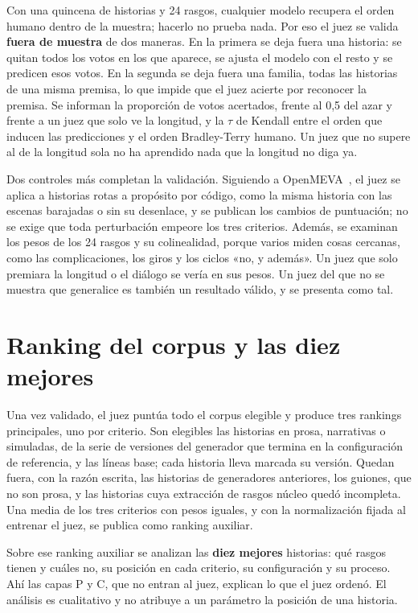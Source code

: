 Con una quincena de historias y 24 rasgos, cualquier modelo recupera el orden humano dentro de la
muestra; hacerlo no prueba nada. Por eso el juez se valida \textbf{fuera de muestra} de dos maneras.
En la primera se deja fuera una historia: se quitan todos los votos en los que aparece, se ajusta el
modelo con el resto y se predicen esos votos. En la segunda se deja fuera una familia, todas las
historias de una misma premisa, lo que impide que el juez acierte por reconocer la premisa. Se
informan la proporción de votos acertados, frente al 0,5 del azar y frente a un juez que solo ve
la longitud, y la $\tau$ de Kendall entre el orden que inducen las predicciones y el orden
Bradley-Terry humano. Un juez que no supere al de la longitud sola no ha aprendido nada que la
longitud no diga ya.

Dos controles más completan la validación. Siguiendo a OpenMEVA~\cite{guan2021}, el juez se aplica a
historias rotas a propósito por código, como la misma historia con las escenas barajadas o sin su
desenlace, y se publican los cambios de puntuación; no se exige que toda perturbación empeore los
tres criterios. Además, se examinan los pesos de los 24 rasgos y su colinealidad, porque varios
miden cosas cercanas, como las complicaciones, los giros y los ciclos «no, y además». Un juez que
solo premiara la longitud o el diálogo se vería en sus pesos. Un juez del que no se muestra que
generalice es también un resultado válido, y se presenta como tal.

\section{Ranking del corpus y las diez mejores}\label{sec:ranking}

Una vez validado, el juez puntúa todo el corpus elegible y produce tres rankings principales, uno por
criterio. Son elegibles las historias en prosa, narrativas o simuladas, de la serie de versiones
del generador que termina en la configuración de referencia, y las líneas base; cada historia lleva
marcada su versión. Quedan fuera, con la razón escrita, las historias de generadores anteriores, los
guiones, que no son prosa, y las historias cuya extracción de rasgos núcleo quedó incompleta. Una
media de los tres criterios con pesos iguales, y con la normalización fijada al entrenar el juez, se
publica como ranking auxiliar.

Sobre ese ranking auxiliar se analizan las \textbf{diez mejores} historias: qué rasgos tienen y
cuáles no, su posición en cada criterio, su configuración y su proceso. Ahí las capas P y C, que no
entran al juez, explican lo que el juez ordenó. El análisis es cualitativo y no atribuye a un
parámetro la posición de una historia.

